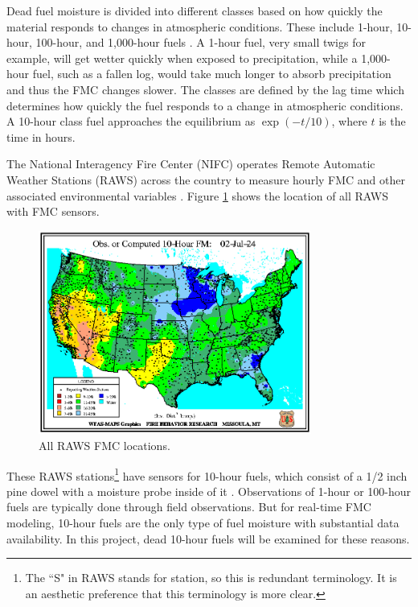 \documentclass[11pt]{article}%
\begin{document}
Dead fuel moisture is divided into different classes based on how quickly the material responds to changes in atmospheric conditions. These include 1-hour, 10-hour, 100-hour, and 1,000-hour fuels \cite{NCEI-2024-DFM}. A 1-hour fuel, very small twigs for example, will get wetter quickly when exposed to precipitation, while a 1,000-hour fuel, such as a fallen log, would take much longer to absorb precipitation and thus the FMC changes slower. The classes are defined by the lag time which determines how quickly the fuel responds to a change in atmospheric conditions. A 10-hour class fuel approaches the equilibrium as $\exp(-t/10)$, where $t$ is the time in hours.

The National Interagency Fire Center (NIFC) operates Remote Automatic Weather Stations (RAWS) across the country to measure hourly FMC and other associated environmental variables \cite{NIFC}. Figure \ref{fig:wfas_raws} shows the location of all RAWS with FMC sensors.

\begin{figure}[ht]
    \centering
    \includegraphics[width=0.8\textwidth]{images/WFAS-RAWS-map.png}
    \caption{All RAWS FMC locations.}
    \label{fig:wfas_raws}
\end{figure}

These RAWS stations\footnote{The ``S" in RAWS stands for station, so this is redundant terminology. It is an aesthetic preference that this terminology is more clear.} have sensors for 10-hour fuels, which consist of a 1/2 inch pine dowel with a moisture probe inside of it \cite{cs_10h}. Observations of 1-hour or 100-hour fuels are typically done through field observations. But for real-time FMC modeling, 10-hour fuels are the only type of fuel moisture with substantial data availability. In this project, dead 10-hour fuels will be examined for these reasons.
\end{document}

